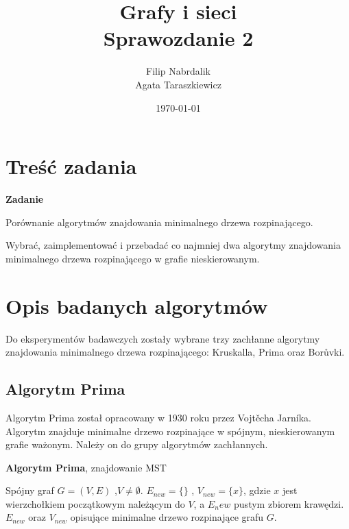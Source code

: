 \documentclass[a4paper, 10pt]{article}
\title{{\bf {Grafy i sieci}} \\ {\large Sprawozdanie 2}}
\date{\today}
\author{Filip Nabrdalik \\Agata Taraszkiewicz}
\begin{document}


\maketitle 




\newcommand{\ang}[1]{(ang. {\em #1}\/)}
\newcommand{\e}[1]{{\em #1}\/}





\section{Treść zadania}

{\bf{Zadanie}}

Porównanie algorytmów znajdowania minimalnego drzewa rozpinającego.

Wybrać, zaimplementować i przebadać co najmniej dwa algorytmy znajdowania minimalnego drzewa rozpinającego w grafie nieskierowanym. 

 

\section{Opis badanych algorytmów}

Do eksperymentów badawczych zostały wybrane trzy zachłanne algorytmy znajdowania minimalnego drzewa rozpinającego: Kruskalla, Prima oraz
Borůvki.

	\subsection{Algorytm Prima}
Algorytm Prima został opracowany w 1930 roku przez Vojtěcha Jarníka. Algorytm znajduje minimalne drzewo rozpinające w spójnym, nieskierowanym grafie ważonym. Należy on do grupy algorytmów zachłannych.
\begin{algorithm}
\caption{{\bf Algorytm Prima}, znajdowanie MST}
\begin{algorithmic}[!h]
\REQUIRE Spójny graf $G=(V,E)$ ,$V \neq \emptyset$. 
\ENSURE $E_{new}=\{\}$ , $V_{new}=\{x\}$, gdzie $x$ jest wierzchołkiem początkowym należącym do $V$, a $E_new$ pustym zbiorem krawędzi.
\STATE {}
\STATE {}   
\ENDWHILE
\RETURN $E_{new}$ oraz $V_{new}$ opisujące minimalne drzewo rozpinające grafu $G$. 
\end{algorithmic}
\end{algorithm}	
\FloatBarrier
\end{document}
